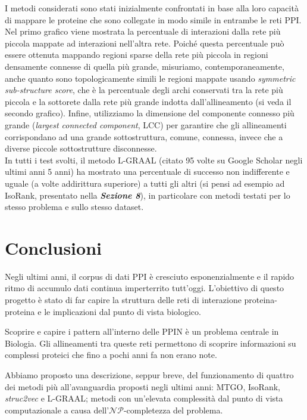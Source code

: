 \documentclass[11pt]{article}
\begin{document}
I metodi considerati sono stati inizialmente confrontati in base alla loro capacità di mappare le proteine che sono collegate in modo simile in entrambe le reti PPI. Nel primo grafico viene mostrata la percentuale di interazioni dalla rete più piccola mappate ad interazioni nell'altra rete. Poiché questa percentuale può essere ottenuta mappando regioni sparse della rete più piccola in regioni densamente connesse di quella più grande, misuriamo, contemporaneamente, anche quanto sono topologicamente simili  le regioni mappate usando \textit{symmetric sub-structure score}, che è la percentuale degli archi conservati tra la rete più piccola e la sottorete dalla rete più grande indotta dall'allineamento (si veda il secondo grafico). Infine, utilizziamo la dimensione del componente connesso più grande (\textit{largest connected component}, LCC) per garantire che gli allineamenti corrispondano ad una grande sottostruttura, comune, connessa, invece che a diverse piccole sottostrutture disconnesse.\\

In tutti i test svolti, il metodo L-GRAAL (citato 95 volte su Google Scholar negli ultimi anni 5 anni) ha mostrato una percentuale di successo non indifferente e uguale (a volte addirittura superiore) a tutti gli altri (si pensi ad esempio ad IsoRank, presentato nella \textit{\textbf{Sezione 8}}), in particolare con metodi testati per lo stesso problema e sullo stesso dataset.\\



\pagebreak
\section{Conclusioni}
Negli ultimi anni, il corpus di dati PPI è cresciuto esponenzialmente e il rapido ritmo di accumulo dati continua imperterrito tutt'oggi. L'obiettivo di questo progetto è stato di far capire la struttura delle reti di interazione proteina-proteina e le implicazioni dal punto di vista biologico.

Scoprire e capire i pattern all'interno delle PPIN è un problema centrale in Biologia. Gli allineamenti tra queste reti permettono di scoprire informazioni su complessi proteici che fino a pochi anni fa non erano note. 

Abbiamo proposto una descrizione, seppur breve, del funzionamento di quattro dei metodi più all'avanguardia proposti negli ultimi anni: MTGO, IsoRank, \textit{struc2vec} e L-GRAAL; metodi con un'elevata complessità dal punto di vista computazionale a causa dell'$\mathcal{NP}$-completezza del problema.\\
\end{document}
